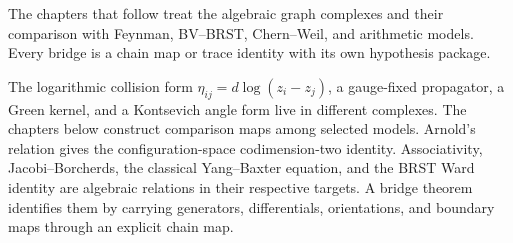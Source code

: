 \documentclass[11pt]{memoir}
\begin{document}
The chapters that follow treat the algebraic graph complexes and
their comparison with Feynman, BV--BRST, Chern--Weil, and arithmetic
models.  Every bridge is a chain map or trace identity with its own
hypothesis package.



\noindent
The logarithmic collision form
$\eta_{ij}=d\log(z_i-z_j)$, a gauge-fixed propagator, a Green kernel,
and a Kontsevich angle form live in different complexes.  The
chapters below construct comparison maps among selected models.
Arnold's relation gives the configuration-space codimension-two
identity.  Associativity, Jacobi--Borcherds, the classical
Yang--Baxter equation, and the BRST Ward identity are algebraic
relations in their respective targets.  A bridge theorem identifies
them by carrying generators, differentials, orientations, and
boundary maps through an explicit chain map.


\ifannalsedition
\else



\fi

\ifannalsedition\else
 
 
 
\fi
\end{document}
